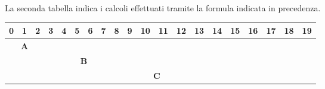 \documentclass[a4]{article}
\begin{document}
La seconda tabella indica i calcoli effettuati tramite la formula indicata in precedenza.
\begin{table}[h!]
    \centering
    \label{my-label}
    \begin{tabular}{|lll|llllll|llll|ll|lllll|}
        \hline
        \multicolumn{1}{|l|}{0}                                  & \multicolumn{1}{l|}{1} & 2 & \multicolumn{1}{l|}{3}                                  & \multicolumn{1}{l|}{4} & \multicolumn{1}{l|}{5} & \multicolumn{1}{l|}{6} & \multicolumn{1}{l|}{7} & 8 & \multicolumn{1}{l|}{9}                                  & \multicolumn{1}{l|}{10} & \multicolumn{1}{l|}{11} & 12 & \multicolumn{1}{l|}{13}                                 & 14 & \multicolumn{1}{l|}{15}                                 & \multicolumn{1}{l|}{16} & \multicolumn{1}{l|}{17} & \multicolumn{1}{l|}{18} & 19 \\ \hline
        \multicolumn{3}{|c|}{\cellcolor[HTML]{656565}\textbf{A}} &                        &   &                                                         &                        &                        &                        &                        &   &                                                         &                         &                         &    &                                                         &    &                                                         &                         &                                                        \\ \hline
                                                                 &                        &   & \multicolumn{6}{c|}{\cellcolor[HTML]{656565}\textbf{B}} &                        &                        &                        &                        &   &                                                         &                         &                         &    &                                                         &                                                                                                                                                 \\ \hline
                                                                 &                        &   &                                                         &                        &                        &                        &                        &   & \multicolumn{4}{c|}{\cellcolor[HTML]{656565}\textbf{C}} &                         &                         &    &                                                         &    &                                                         &                                                                                  \\ \hline

\end{tabular}
\end{table}
\end{document}
